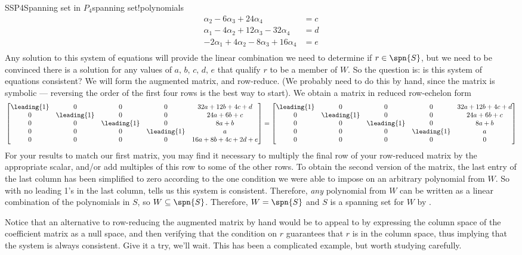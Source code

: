 \begin{example}{SSP4}{Spanning set in $P_4$}{spanning set!polynomials}
\begin{align*}
\alpha_2-6\alpha_3+24\alpha_4&=c\\
\alpha_1-4\alpha_2+12\alpha_3-32\alpha_4&=d\\
-2\alpha_1+4\alpha_2-8\alpha_3+16\alpha_4&=e\\
\end{align*}
%
Any solution to this system of equations will provide the linear combination we need to determine if $r\in\spn{S}$, but we need to be convinced there is a solution for any values of $a,\,b,\,c,\,d,\,e$ that qualify $r$ to be a member of $W$.  So the question is:  is this system of equations consistent?  We will form the augmented matrix, and row-reduce. (We probably need to do this by hand, since the matrix is symbolic --- reversing the order of the first four rows is the best way to start).  We obtain a matrix in reduced row-echelon form
%
\begin{equation*}
\begin{bmatrix}
\leading{1}&0&0&0&32a+12b+4c+d\\
0&\leading{1}&0&0&24a+6b+c\\
0&0&\leading{1}&0&8a+b\\
0&0&0&\leading{1}&a\\
0&0&0&0&16a+8b+4c+2d+e
\end{bmatrix}
=
\begin{bmatrix}
\leading{1}&0&0&0&32a+12b+4c+d\\
0&\leading{1}&0&0&24a+6b+c\\
0&0&\leading{1}&0&8a+b\\
0&0&0&\leading{1}&a\\
0&0&0&0&0
\end{bmatrix}
\end{equation*}
%
For your results to match our first matrix, you may find it necessary to multiply the final row of your row-reduced matrix by the appropriate scalar, and/or add multiples of this row to some of the other rows.  To obtain the second version of the matrix, the last entry of the last column has been simplified to zero according to the one condition we were able to impose on an arbitrary polynomial from $W$.    So with no leading 1's in the last column,  tells us this system is consistent.  Therefore, {\em any} polynomial from $W$ can be written as a linear combination of the polynomials in $S$, so $W\subseteq\spn{S}$. Therefore,  $W=\spn{S}$ and $S$ is a spanning set for $W$ by .\par
%
Notice that an alternative to row-reducing the augmented matrix by hand would be to appeal to  by expressing the column space of the coefficient matrix as a null space, and then verifying that the condition on $r$ guarantees that $r$ is in the column space, thus implying that the system is always consistent.  Give it a try, we'll wait.  This has been a complicated example, but worth studying carefully.
\end{example}
